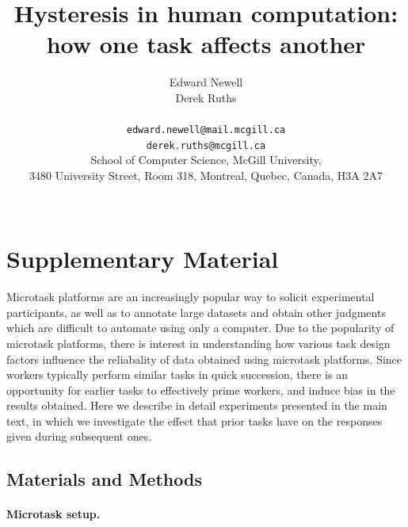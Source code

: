 \documentclass[12pt]{article}
\title{Hysteresis in human computation:\\ how one task affects another}
\author
{Edward Newell \\ Derek Ruths\\
\\
\normalsize{\texttt{edward.newell@mail.mcgill.ca}}\\
\normalsize{\texttt{derek.ruths@mcgill.ca}}\\
\normalsize{School of Computer Science, McGill University,}\\
\normalsize{3480 University Street, Room 318, Montreal, Quebec, Canada, H3A 2A7}\\
\\
}
\date{}
\begin{document}
 


\baselineskip24pt


\maketitle 




\section*{Supplementary Material}
\renewcommand{\figurename}{Figure S\!\!}
\renewcommand{\tablename}{Table S\!\!}
\renewcommand{\theequation}{S\arabic{equation}}
\setcounter{figure}{0}
\setcounter{table}{0}
\setcounter{equation}{0}

Microtask platforms are an increasingly popular way to solicit experimental
participants, as well as to annotate large datasets and obtain other 
judgments which are difficult to automate using only a computer.  
Due to the popularity of microtask platforms, there is interest in 
understanding how various task design factors
influence the reliabality of data obtained using microtask platforms.  
Since workers typically perform similar tasks in quick succession, there is
an opportunity for earlier tasks to effectively prime workers, and induce 
bias in the results obtained.
Here we describe in detail experiments presented in the main text, in which
we investigate the effect that prior tasks have on the responses given during
subsequent ones.  

\subsection*{Materials and Methods}

\paragraph{Microtask setup.}
\end{document}
